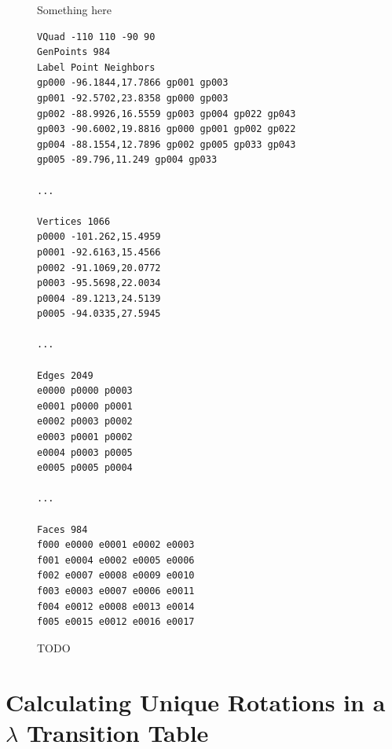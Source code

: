\documentclass[a4paper,11pt,twoside]{report}
\begin{document}
\begin{appendices}
\begin{figure}
\begin{tabular}{cccc}

\end{tabular}
\caption[Rhomb Single Run Sequence]{
    Something here
}
\label{fig:crh_666_seq}

\end{figure}


\begin{figure}
\centering
\begin{verbatim}
VQuad -110 110 -90 90
GenPoints 984
Label Point Neighbors
gp000 -96.1844,17.7866 gp001 gp003
gp001 -92.5702,23.8358 gp000 gp003
gp002 -88.9926,16.5559 gp003 gp004 gp022 gp043
gp003 -90.6002,19.8816 gp000 gp001 gp002 gp022
gp004 -88.1554,12.7896 gp002 gp005 gp033 gp043
gp005 -89.796,11.249 gp004 gp033

...

Vertices 1066
p0000 -101.262,15.4959
p0001 -92.6163,15.4566
p0002 -91.1069,20.0772
p0003 -95.5698,22.0034
p0004 -89.1213,24.5139
p0005 -94.0335,27.5945

...

Edges 2049
e0000 p0000 p0003
e0001 p0000 p0001
e0002 p0003 p0002
e0003 p0001 p0002
e0004 p0003 p0005
e0005 p0005 p0004

...

Faces 984
f000 e0000 e0001 e0002 e0003
f001 e0004 e0002 e0005 e0006
f002 e0007 e0008 e0009 e0010
f003 e0003 e0007 e0006 e0011
f004 e0012 e0008 e0013 e0014
f005 e0015 e0012 e0016 e0017
\end{verbatim}
\caption[Canonical Grid Data File]{
	TODO
}
\label{fig:gridfile}
\end{figure}

\section{Calculating Unique Rotations in a $\lambda$ Transition Table}
\label{appB:rot}


\end{appendices}
\end{document}
